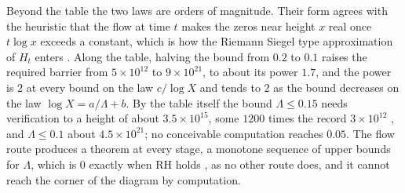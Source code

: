 Beyond the table the two laws are orders of magnitude. Their form agrees with the heuristic that the flow at time $t$ makes the zeros near height $x$ real once $t\log x$ exceeds a constant, which is how the Riemann Siegel type approximation of $H_t$ enters \cite{Polymath}. Along the table, halving the bound from $0.2$ to $0.1$ raises the required barrier from $5\times10^{12}$ to $9\times10^{21}$, to about its power $1.7$, and the power is $2$ at every bound on the law $c/\log X$ and tends to $2$ as the bound decreases on the law $\log X=a/\Lambda+b$. By the table itself the bound $\Lambda\le0.15$ needs verification to a height of about $3.5\times10^{15}$, some $1200$ times the record $3\times10^{12}$ \cite{PT21}, and $\Lambda\le0.1$ about $4.5\times10^{21}$; no conceivable computation reaches $0.05$. The flow route produces a theorem at every stage, a monotone sequence of upper bounds for $\Lambda$, which is $0$ exactly when RH holds \cite{RodgersTao}, as no other route does, and it cannot reach the corner of the diagram by computation.

